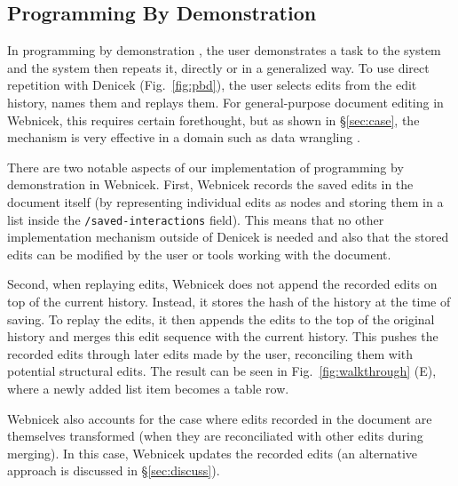 \documentclass[sigconf,anonymous,screen]{acmart}
\begin{document}

\subsection{Programming By Demonstration}
\label{sec:impl-pbd}

In programming by demonstration \cite{cypher-1993-pbd}, the user demonstrates a task to the
system and the system then repeats it, directly or in a generalized way. To use direct
repetition with Denicek (Fig.~\ref{fig:pbd}), the user selects edits from the edit history,
names them and replays them. For general-purpose document editing in Webnicek, this requires
certain forethought, but as shown in \S\ref{sec:case}, the mechanism is very effective
in a domain such as data wrangling \cite{kandel-2011-wrangler}.

There are two notable aspects of our implementation of programming by demonstration in Webnicek.
First, Webnicek records the saved edits in the document itself (by representing individual edits
as nodes and storing them in a list inside the {\small\Verb_/saved-interactions_} field).
This means that no other implementation mechanism outside of Denicek is needed and also
that the stored edits can be modified by the user or tools working with the document.

Second, when replaying edits, Webnicek does not append the recorded edits on top of the current
history. Instead, it stores the hash of the history at the time of saving. To replay the edits,
it then appends the edits to the top of the original history and merges this edit sequence
with the current history. This pushes the recorded edits through later edits made by the user,
reconciling them with potential structural edits. The result can be seen in Fig.~\ref{fig:walkthrough} (E), where
a newly added list item becomes a table row.

Webnicek also accounts for the case where edits recorded in the document are themselves
transformed (when they are reconciliated with other edits during merging). In this case, Webnicek
updates the recorded edits (an alternative approach is discussed in \S\ref{sec:discuss}).

\end{document}
